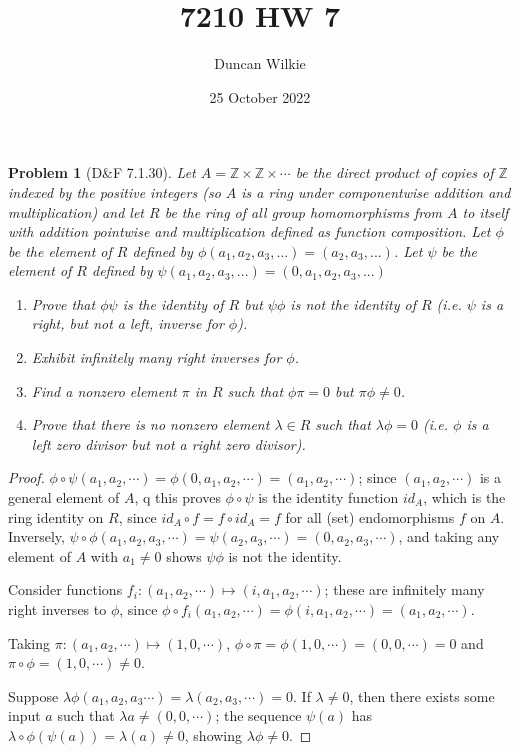 \documentclass{article}
\title{7210 HW 7}
\author{Duncan Wilkie}
\date{25 October 2022}
\newtheorem{plm}{Problem}
\begin{document}
\maketitle

\begin{plm}[D\&F 7.1.30]
  Let $A = \mathbb{Z} \times \mathbb{Z} \times \cdots$ be the direct product of copies of $\mathbb{Z}$ indexed by the positive integers
  (so $A$ is a ring under componentwise addition and multiplication) and let $R$ be the ring of all group homomorphisms from $A$ to itself
  with addition pointwise and multiplication defined as function composition.
  Let $\phi$ be the element of $R$ defined by $\phi(a_{1}, a_{2}, a_{3}, ...) = (a_{2}, a_{3}, ...)$.
  Let $\psi$ be the element of $R$ defined by $\psi(a_{1}, a_{2}, a_{3}, ...) = (0, a_{1}, a_{2}, a_{3},...)$
  \begin{enumerate}
  \item Prove that $\phi\psi$ is the identity of $R$ but $\psi\phi$ is not the identity of $R$ (i.e. $\psi$ is a right, but not a left, inverse for $\phi$).
  \item Exhibit infinitely many right inverses for $\phi$.
  \item Find a nonzero element $\pi$ in $R$ such that $\phi\pi = 0$ but $\pi\phi \neq 0$.
  \item Prove that there is no nonzero element $\lambda \in R$ such that $\lambda\phi = 0$ (i.e. $\phi$ is a left zero divisor but not a right zero divisor).
  \end{enumerate}
\end{plm}

\begin{proof}
  $\phi\circ\psi(a_{1}, a_{2}, \cdots)  = \phi(0, a_{1}, a_{2}, \cdots) = (a_{1}, a_{2}, \cdots)$; since $(a_{1}, a_{2}, \cdots)$ is a general element of $A$,
q  this proves $\phi \circ \psi$ is the identity function $id_{A}$, which is the ring identity on $R$,
  since $id_{A} \circ f = f \circ id_{A} = f$ for all (set) endomorphisms $f$ on $A$.
  Inversely, $\psi \circ \phi(a_{1}, a_{2}, a_{3}, \cdots) = \psi(a_{2}, a_{3}, \cdots) = (0, a_{2}, a_{3}, \cdots)$,
  and taking any element of $A$ with $a_{1} \neq 0$ shows $\psi\phi$ is not the identity.

  Consider functions $f_{i}: (a_{1}, a_{2}, \cdots) \mapsto (i, a_{1}, a_{2}, \cdots)$; these are infinitely many right inverses to $\phi$,
  since $\phi \circ f_{i}(a_{1}, a_{2}, \cdots) = \phi(i, a_{1}, a_{2}, \cdots) = (a_{1}, a_{2}, \cdots)$.

  Taking $\pi: (a_{1}, a_{2}, \cdots) \mapsto (1, 0, \cdots)$, $\phi \circ \pi = \phi(1, 0, \cdots) = (0, 0, \cdots) = 0$
  and $\pi \circ \phi = (1, 0, \cdots) \neq 0$.

  Suppose $\lambda\phi(a_{1}, a_{2}, a_{3} \cdots) = \lambda(a_{2}, a_{3}, \cdots) = 0$.
  If $\lambda \neq 0$, then there exists some input $a$ such that $\lambda a \neq (0, 0, \cdots)$;
  the sequence $\psi(a)$ has $\lambda\circ\phi(\psi(a)) = \lambda(a) \neq 0$, showing $\lambda\phi \neq 0$.
\end{proof}
\end{document}

